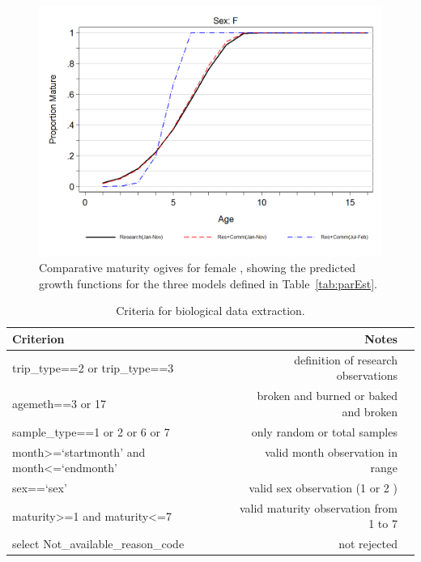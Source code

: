 \begin{figure}[htp]
\captionsetup[subfigure]{labelformat=empty}
\begin{center}
\includegraphics[bb=0 0 925 600,width=6in,keepaspectratio=true]{appD-Biology/maturityOgiveCompare.png}
\end{center}
\caption{Comparative maturity ogives for female \fishname, showing the predicted growth functions for the three models defined in Table~\ref{tab:parEst}.}
\label{fig:maturityOgiveCompare}
\end{figure}

\clearpage


\begin{table}[b]
\centering
\caption{\label{tab:bioCrit} Criteria for biological data extraction.}
\begin{tabular}{lrr}
\hline
Criterion & Notes \\
\hline
trip\_type==2 or trip\_type==3                               & definition of research observations \\
agemeth==3 or 17                                             & broken and burned or baked and broken \\
sample\_type==1 or 2 or 6 or 7                               & only random or total samples \\
month\textgreater=`startmonth' and month\textless=`endmonth' & valid month observation in range \\
sex==`sex'	                                                 & valid sex observation (1 or 2 ) \\
maturity\textgreater=1 and maturity\textless=7	             & valid maturity observation from 1 to 7 \\
select Not\_available\_reason\_code                          & not rejected \\
\hline
\end{tabular}
\end{table}

